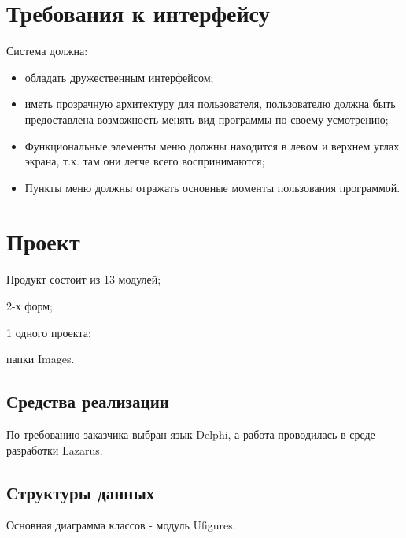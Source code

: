 \documentclass[a4paper,12pt]{article}
\begin{document}
\section{Требования к интерфейсу}

Система должна:

\begin{itemize}
	\item  обладать дружественным интерфейсом;
	\item  иметь прозрачную архитектуру для пользователя, пользователю должна быть предоставлена возможность менять вид программы по своему усмотрению;
	\item  Функциональные элементы меню должны находится в левом и верхнем углах экрана, т.к. там они легче всего воспринимаются;
	\item  Пункты меню должны отражать основные моменты пользования программой.
\end{itemize}


\section{Проект}

Продукт состоит из 13 модулей;

2-х форм;

1 одного проекта;

папки Images.


\subsection{Средства реализации}

По требованию заказчика выбран язык Delphi, а работа проводилась в среде разработки Lazarus.


\subsection{Структуры данных}

Основная диаграмма классов - модуль Ufigures.
\end{document}
